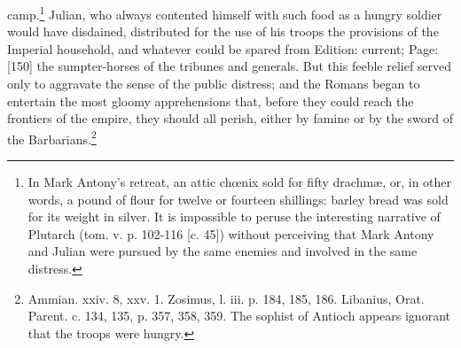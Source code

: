 camp.\footnote{In Mark Antony\texthebrew{}’s retreat, an attic chœnix sold for fifty drachmæ, or, in other words, a pound of flour for twelve or fourteen shillings: barley bread was sold for its weight in silver. It is impossible to peruse the interesting narrative of Plutarch (tom. v. p. 102-116 [c. 45]) without perceiving that Mark Antony and Julian were pursued by the same enemies and involved in the same distress.} Julian, who always contented himself with such food as a hungry soldier would have disdained, distributed for the use of his troops the provisions of the Imperial household, and whatever could be spared from Edition: current; Page: [150] the sumpter-horses of the tribunes and generals. But this feeble relief served only to aggravate the sense of the public distress; and the Romans began to entertain the most gloomy apprehensions that, before they could reach the frontiers of the empire, they should all perish, either by famine or by the sword of the Barbarians.\footnote{Ammian. xxiv. 8, xxv. 1. Zosimus, l. iii. p. 184, 185, 186. Libanius, Orat. Parent. c. 134, 135, p. 357, 358, 359. The sophist of Antioch appears ignorant that the troops were hungry.}

